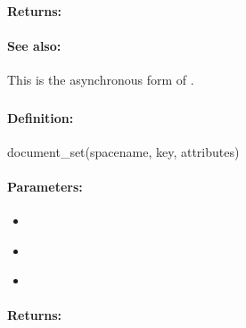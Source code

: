 \paragraph{Returns:}


\paragraph{See also:}  This is the asynchronous form of .

\pagebreak
\subsubsection{}
\label{api:ruby:document_set}


\paragraph{Definition:}
\begin{rubycode}
document_set(spacename, key, attributes)
\end{rubycode}

\paragraph{Parameters:}
\begin{itemize}[noitemsep]
\item {}\\

\item {}\\

\item {}\\

\end{itemize}

\paragraph{Returns:}


\pagebreak
\subsubsection{}
\label{api:ruby:async_document_set}


